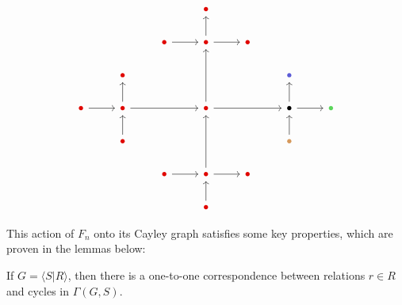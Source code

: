 \[\begin{tikzcd}
	&&& \textcolor{rgb,255:red,224;green,7;blue,0}{\bullet} &&& \\
	&& \textcolor{rgb,255:red,224;green,7;blue,0}{\bullet} & \textcolor{rgb,255:red,224;green,7;blue,0}{\bullet} & \textcolor{rgb,255:red,224;green,7;blue,0}{\bullet} \\
	& \textcolor{rgb,255:red,224;green,7;blue,0}{\bullet} &&&& \textcolor{rgb,255:red,92;green,92;blue,214}{\bullet} \\
	\textcolor{rgb,255:red,224;green,7;blue,0}{\bullet} & \textcolor{rgb,255:red,224;green,7;blue,0}{\bullet} && \textcolor{rgb,255:red,224;green,7;blue,0}{\bullet} && \bullet & \textcolor{rgb,255:red,92;green,214;blue,92}{\bullet} \\
	& \textcolor{rgb,255:red,224;green,7;blue,0}{\bullet} &&&& \textcolor{rgb,255:red,214;green,153;blue,92}{\bullet} \\
	&& \textcolor{rgb,255:red,224;green,7;blue,0}{\bullet} & \textcolor{rgb,255:red,224;green,7;blue,0}{\bullet} & \textcolor{rgb,255:red,224;green,7;blue,0}{\bullet} \\
	&&& \textcolor{rgb,255:red,224;green,7;blue,0}{\bullet}
	\arrow[from=2-3, to=2-4]
	\arrow[from=2-4, to=1-4]
	\arrow[from=2-4, to=2-5]
	\arrow[from=4-1, to=4-2]
	\arrow[from=4-2, to=3-2]
	\arrow[from=4-2, to=4-4]
	\arrow[from=4-4, to=2-4]
	\arrow[from=4-4, to=4-6]
	\arrow[from=4-6, to=3-6]
	\arrow[from=4-6, to=4-7]
	\arrow[from=5-2, to=4-2]
	\arrow[from=5-6, to=4-6]
	\arrow[from=6-3, to=6-4]
	\arrow[from=6-4, to=4-4]
	\arrow[from=6-4, to=6-5]
	\arrow[from=7-4, to=6-4]
\end{tikzcd}\]

This action of $F_n$ onto its Cayley graph satisfies some key properties, which are proven in the lemmas below:

\begin{lemma}\label{Relations are Cycles in the Cayley Graph}
    If $G = \langle S | R \rangle$, then there is a one-to-one correspondence between relations $r \in R$ and cycles in $\Gamma(G,S)$. 
\end{lemma}

